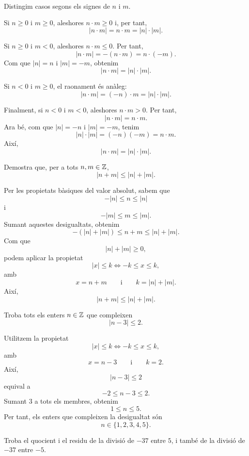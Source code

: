 \begin{solucio}
Distingim casos segons els signes de $n$ i $m$.

Si $n\geq 0$ i $m\geq 0$, aleshores $n\cdot m\geq 0$ i, per tant,
\[
|n\cdot m|=n\cdot m=|n|\cdot |m|.
\]

Si $n\geq 0$ i $m<0$, aleshores $n\cdot m\leq 0$. Per tant,
\[
|n\cdot m|=-(n\cdot m)=n\cdot(-m).
\]
Com que $|n|=n$ i $|m|=-m$, obtenim
\[
|n\cdot m|=|n|\cdot |m|.
\]

Si $n<0$ i $m\geq 0$, el raonament és anàleg:
\[
|n\cdot m|=(-n)\cdot m=|n|\cdot |m|.
\]

Finalment, si $n<0$ i $m<0$, aleshores $n\cdot m>0$. Per tant,
\[
|n\cdot m|=n\cdot m.
\]
Ara bé, com que $|n|=-n$ i $|m|=-m$, tenim
\[
|n|\cdot |m|=(-n)(-m)=n\cdot m.
\]
Així,
\[
|n\cdot m|=|n|\cdot |m|.
\]
\end{solucio}


\begin{exercici}
Demostra que, per a tots $n,m\in\mathbb{Z}$,
\[
|n+m|\leq |n|+|m|.
\]
\end{exercici}

\begin{solucio}
Per les propietats bàsiques del valor absolut, sabem que
\[
-|n|\leq n\leq |n|
\]
i
\[
-|m|\leq m\leq |m|.
\]
Sumant aquestes desigualtats, obtenim
\[
-(|n|+|m|)\leq n+m\leq |n|+|m|.
\]
Com que
\[
|n|+|m|\geq 0,
\]
podem aplicar la propietat
\[
|x|\leq k \iff -k\leq x\leq k,
\]
amb
\[
x=n+m
\qquad\text{i}\qquad
k=|n|+|m|.
\]
Així,
\[
|n+m|\leq |n|+|m|.
\]
\end{solucio}


\begin{exercici}
Troba tots els enters $n\in\mathbb{Z}$ que compleixen
\[
|n-3|\leq 2.
\]
\end{exercici}

\begin{solucio}
Utilitzem la propietat
\[
|x|\leq k \iff -k\leq x\leq k,
\]
amb
\[
x=n-3
\qquad\text{i}\qquad
k=2.
\]
Així,
\[
|n-3|\leq 2
\]
equival a
\[
-2\leq n-3\leq 2.
\]
Sumant $3$ a tots els membres, obtenim
\[
1\leq n\leq 5.
\]
Per tant, els enters que compleixen la desigualtat són
\[
n\in\{1,2,3,4,5\}.
\]
\end{solucio}


\begin{exercici}
Troba el quocient i el residu de la divisió de $-37$ entre $5$, i també de la divisió de $-37$ entre $-5$.
\end{exercici}

